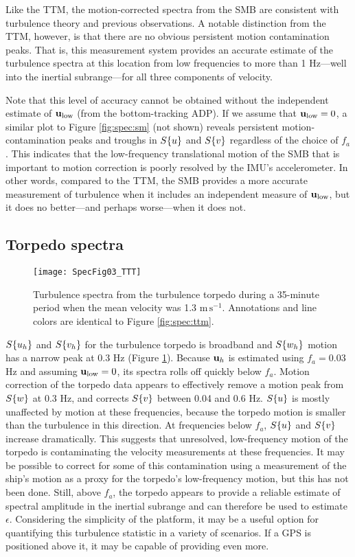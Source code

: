Like the TTM, the motion-corrected spectra from the SMB are consistent with turbulence theory and previous observations. A notable distinction from the TTM, however, is that there are no obvious persistent motion contamination peaks. That is, this measurement system provides an accurate estimate of the turbulence spectra at this location from low frequencies to more than 1 Hz---well into the inertial subrange---for all three components of velocity.

Note that this level of accuracy cannot be obtained without the independent estimate of $\mathbf{u}_\mathrm{low}$ (from the bottom-tracking ADP). If we assume that $\mathbf{u}_\mathrm{low}=0$, a similar plot to Figure \ref{fig:spec:sm} (not shown) reveals persistent motion-contamination peaks and troughs in $S\{u\}$ and $S\{v\}$ regardless of the choice of $f_a$. This indicates that the low-frequency translational motion of the SMB that is important to motion correction is poorly resolved by the IMU's accelerometer. In other words, compared to the TTM, the SMB provides a more accurate measurement of turbulence when it includes an independent measure of $\mathbf{u}_\mathrm{low}$, but it does no better---and perhaps worse---when it does not.

\subsection{Torpedo spectra}

\begin{figure}[t]
  \centering
  \texttt{[image: SpecFig03\_TTT]}
  \caption{Turbulence spectra from the turbulence torpedo during a 35-minute period when the mean velocity was 1.3 $\mathrm{m\,s^{-1}}$. Annotations and line colors are identical to Figure \ref{fig:spec:ttm}.}
  \label{fig:spec:torpedo}
\end{figure}

$S\{u_{h}\}$ and $S\{v_{h}\}$ for the turbulence torpedo is broadband and $S\{w_{h}\}$ motion has a narrow peak at 0.3 Hz (Figure \ref{fig:spec:torpedo}). Because $\mathbf{u}_{h}$ is estimated using $f_a = 0.03$ Hz and assuming $\mathbf{u}_\mathrm{low}=0$, its spectra rolls off quickly below $f_a$.  Motion correction of the torpedo data appears to effectively remove a motion peak from $S\{w\}$ at 0.3 Hz, and corrects $S\{v\}$ between 0.04 and 0.6 Hz. $S\{u\}$ is mostly unaffected by motion at these frequencies, because the torpedo motion is smaller than the turbulence in this direction. At frequencies below $f_a$, $S\{u\}$ and $S\{v\}$ increase dramatically. This suggests that unresolved, low-frequency motion of the torpedo is contaminating the velocity measurements at these frequencies. It may be possible to correct for some of this contamination using a measurement of the ship's motion as a proxy for the torpedo's low-frequency motion, but this has not been done. Still, above $f_a$, the torpedo appears to provide a reliable estimate of spectral amplitude in the inertial subrange and can therefore be used to estimate $\epsilon$. Considering the simplicity of the platform, it may be a useful option for quantifying this turbulence statistic in a variety of scenarios. If a GPS is positioned above it, it may be capable of providing even more.


